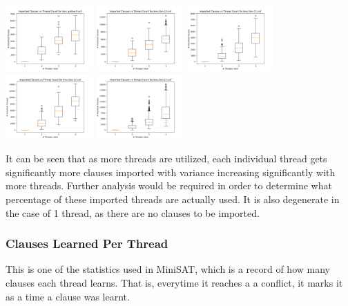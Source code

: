 \documentclass[11pt]{extarticle}
\begin{document}
\includegraphics[width=0.25\textwidth]{figures/bmc-galileo-9imp.png}
\includegraphics[width=0.25\textwidth]{figures/bmc-ibm-10imp.png}
\includegraphics[width=0.25\textwidth]{figures/bmc-ibm-11imp.png}
\includegraphics[width=0.25\textwidth]{figures/bmc-ibm-12imp.png}
\includegraphics[width=0.25\textwidth]{figures/bmc-ibm-13imp.png}

It can be seen that as more threads are utilized, each individual thread gets significantly more
clauses imported with variance increasing significantly with more threads. Further analysis
would be required in order to determine what percentage of these imported threads are actually
used. It is also degenerate in the case of 1 thread, as there are no clauses to be imported.

\subsubsection*{Clauses Learned Per Thread}

This is one of the statistics used in MiniSAT, which is a record of how many clauses each thread
learns. That is, everytime it reaches a a conflict, it marks it as a time a clause was learnt.
\end{document}
